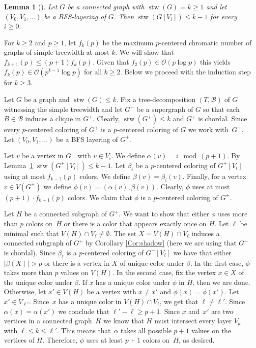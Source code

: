 \documentclass[11pt]{article}
\newtheorem{lemma}[theorem]{Lemma}
\begin{document}
\begin{lemma}[\cite{JM-weak-cols}]
\label{lem:stw_layering}
Let $G$ be a connected graph with $\operatorname{stw}(G)=k \geq 1$ and let
$(V_0,V_1,\ldots)$ be a BFS-layering of $G$.  Then $\operatorname{stw}(G[V_i]) \leq k-1$ for
every $i\geq0$.
\end{lemma}

For $k\geq2$ and $p\geq1$, 
let $f_k(p)$ be the maximum $p$-centered chromatic number of graphs of simple treewidth at most $k$.
We will show that $f_{k+1}(p)\leq (p+1) f_k(p)$.
Given that $f_2(p)\in\mathcal{O}(p \log p)$ this yields $f_k(p)\in\mathcal{O}(p^{k-1}\log p)$ for all $k\geq2$.
Below we proceed with the induction step for $k\geq3$.

Let $G$ be a graph and $\operatorname{stw}(G)\leq k$.  Fix a tree-decomposition $(T,\mathcal{B})$
of $G$ witnessing the simple treewidth and let $G^+$ be a supergraph of $G$ so
that each $B\in\mathcal{B}$ induces a clique in $G^+$.  Clearly, $\operatorname{stw}(G^+)\leq k$
and $G^+$ is chordal.  Since every $p$-centered coloring of $G^+$ is a
$p$-centered coloring of $G$ we work with~$G^+$.
Let $(V_0,V_1,\ldots)$ be a BFS layering of $G^+$.

Let $v$ be a vertex in $G^+$ with $v\in V_i$. We define $\alpha(v)=i\!\!\mod (p+1)$.
By Lemma~\ref{lem:stw_layering} $\operatorname{stw}(G^+[V_i])\leq k-1$.
Let $\beta_i$ be a $p$-centered coloring of $G^+[V_i]$ 
using at most $f_{k-1}(p)$ colors.
We define $\beta(v)=\beta_i(v)$.
Finally, for a vertex $v\in V(G^+)$ we define $\phi(v)=(\alpha(v),\beta(v))$. 
Clearly, $\phi$ uses at most $(p+1)\cdot f_{k-1}(p)$ colors.
We claim that $\phi$ is a $p$-centered coloring of $G^+$.

Let $H$ be a connected subgraph of $G^+$.
We want to show that either $\phi$ uses more than $p$ colors on~$H$ or
there is a color that appears exactly once on $H$.
Let $\ell$ be minimal such that $V(H)\cap V_{\ell}\neq\emptyset$.
The set $X=V(H)\cap V_{\ell}$ induces a connected subgraph of $G^+$ by
Corollary \ref{Cor:shadow} (here we are using that $G^+$ is chordal).
Since $\beta_{\ell}$ is a $p$-centered coloring of $G^+[V_{\ell}]$ we have that
either $|\beta(X)|>p$
or there is a vertex in $X$ 
of unique color under $\beta$.
In the first case, $\phi$ takes more than $p$ values on $V(H)$.
In the second case, fix the vertex $x\in X$ of the unique color under $\beta$.
If $x$ has a unique color under $\phi$ in $H$, then we are done.
Otherwise, let $x'\in V(H)$ be a vertex with $x\neq x'$ and $\phi(x)=\phi(x')$.
Let $x'\in V_{\ell'}$.
Since~$x$ has a unique color in $V(H)\cap V_{\ell}$, we get that $\ell\neq\ell'$.
Since $\alpha(x)=\alpha(x')$ we conclude that $\ell'-\ell\geq p+1$.
Since $x$ and~$x'$ are two vertices in a connected graph~$H$ 
we know that $H$ must intersect every layer $V_k$ with $\ell\leq k \leq \ell'$.
This means that~$\alpha$ takes all possible $p+1$ values on the vertices of $H$.
Therefore, $\phi$ uses at least $p+1$ colors on~$H$, as desired.
\end{document}
